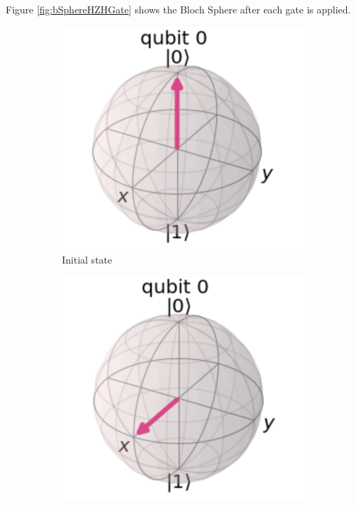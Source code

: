 Figure \ref{fig:bSphereHZHGate} shows the Bloch Sphere after each gate is applied.

\begin{figure}[h]
    \centering
    \begin{subfigure}[h]{0.24\textwidth}
        \centering
        \includegraphics[width=\textwidth]{lab2/hzhGate1.png}
        \caption{Initial state}
        \label{fig:hzhGate1}
    \end{subfigure}
    \hfill
    \begin{subfigure}[h]{0.24\textwidth}
        \centering
        \includegraphics[width=\textwidth]{lab2/hzhGate2.png}

\end{subfigure}
\end{figure}
